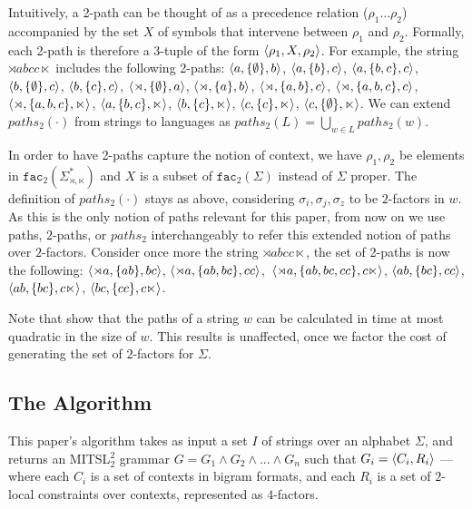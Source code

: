 \documentclass[11pt,a4paper]{article}
\newcommand{\facn}[1]{\ensuremath{\texttt{fac}_{#1}}}
\begin{document}
Intuitively, a 2-path can be thought of as a precedence relation ($\rho_1\ldots{}\rho_2$) accompanied by the set $X$ of symbols that intervene between $\rho_1$ and $\rho_2$. Formally, each 2-path is therefore a 3-tuple of the form $\langle{\rho_1, X, \rho_2}\rangle$. For example, the string $\rtimes abcc\ltimes$ includes the following 2-paths: 
$\langle{a, \{\emptyset\}, b}\rangle$, $\langle{a, \{b\}, c}\rangle$, $\langle{a, \{b,c\}, c}\rangle$, $\langle{b, \{\emptyset\}, c}\rangle$, $\langle{b, \{c\}, c}\rangle$, $\langle{\rtimes, \{\emptyset\}, a}\rangle$, $\langle{\rtimes, \{a\}, b}\rangle$,  $\langle{\rtimes, \{a,b\}, c}\rangle$, $ \langle{\rtimes,\{a,b,c\},c}\rangle$, $ \langle{\rtimes,\{a,b,c\},\ltimes}\rangle$, $\langle{a, \{b,c\}, \ltimes}\rangle$, $ \langle{b, \{c\}, \ltimes}\rangle$, $\langle{c, \{c\}, \ltimes}\rangle$, $ \langle{c, \{\emptyset\}, \ltimes}\rangle$.\@
We can extend  $paths_2(\cdot)$ from strings to languages as $paths_2(L) = \bigcup_{w \in L} paths_2(w)$.

In order to have 2-paths capture the notion of context, we  have   $\rho_1, \rho_2$ be elements in $ \facn{2}(\Sigma^*_{\rtimes,\ltimes})$ and $X$ is a subset of $ \facn{2}(\Sigma)$ instead of $\Sigma$ proper.\@
The definition of $paths_2(\cdot)$ stays as above, considering $\sigma_i,\sigma_j,\sigma_z$ to be $2$-factors in $w$.\@
As this is the only notion of paths relevant for this paper, from now on we use paths, $2$-paths, or $paths_2$ interchangeably to refer this extended notion of paths over $2$-factors.
Consider once more the string $\rtimes abcc\ltimes$,  the set of  2-paths is now the following: 
$\langle{\rtimes a, \{ab\}, bc}\rangle$, $\langle{\rtimes a, \{ab,bc\}, cc}\rangle$,~$\langle{\rtimes a, \{ab,bc,cc\}, c\ltimes}\rangle$, $\langle{ab, \{bc\}, cc}\rangle$, $\langle{ab, \{bc\}, c\ltimes}\rangle$, $\langle{bc,  \{cc\}, c\ltimes}\rangle$. 

Note that  \citet{JardineHeinz16} show that the paths of a string $w$ can be calculated in time at most quadratic in the size of $w$.
This results is unaffected, once we factor the cost of generating the set of $2$-factors for $\Sigma$.


\subsection{The Algorithm}

This paper's algorithm  takes as input a set $I$ of strings over an alphabet $\Sigma$, and returns an MITSL$^2_2$ grammar $G=G_1\wedge G_2\wedge ... \wedge G_n$ such that $G_i=\langle{C_i,R_i}\rangle$ --- where each $C_i$ is a set of contexts in bigram formats, and each $R_i$ is a set of $2$-local constraints over contexts, represented as $4$-factors.
\end{document}
